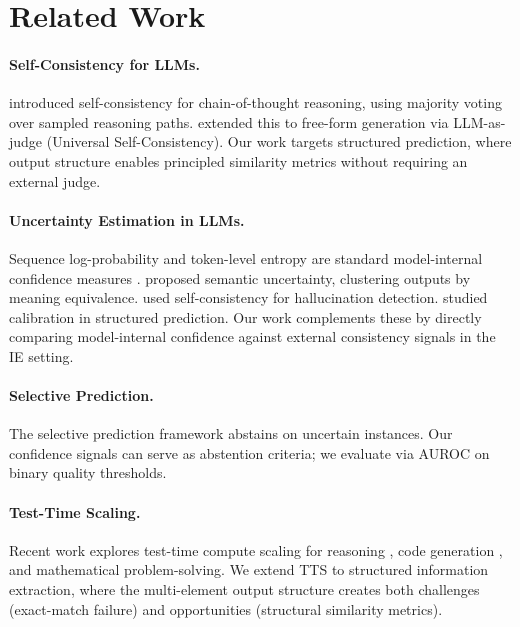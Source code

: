 \documentclass[11pt,a4paper]{article}
\begin{document}
\section{Related Work}

\paragraph{Self-Consistency for LLMs.}
\citet{wang2023selfconsistency} introduced self-consistency for chain-of-thought reasoning, using majority voting over sampled reasoning paths.
\citet{chen2024universal} extended this to free-form generation via LLM-as-judge (Universal Self-Consistency).
Our work targets structured prediction, where output structure enables principled similarity metrics without requiring an external judge.

\paragraph{Uncertainty Estimation in LLMs.}
Sequence log-probability and token-level entropy are standard model-internal confidence measures \cite{kadavath2022language}.
\citet{kuhn2023semantic} proposed semantic uncertainty, clustering outputs by meaning equivalence.
\citet{manakul2023selfcheckgpt} used self-consistency for hallucination detection.
\citet{desai2020calibration} studied calibration in structured prediction.
Our work complements these by directly comparing model-internal confidence against external consistency signals in the IE setting.

\paragraph{Selective Prediction.}
The selective prediction framework \cite{geifman2017selective,kamath2020selective} abstains on uncertain instances.
Our confidence signals can serve as abstention criteria; we evaluate via AUROC on binary quality thresholds.

\paragraph{Test-Time Scaling.}
Recent work explores test-time compute scaling for reasoning \cite{snell2024scaling}, code generation \cite{chen2023codet}, and mathematical problem-solving.
We extend TTS to structured information extraction, where the multi-element output structure creates both challenges (exact-match failure) and opportunities (structural similarity metrics).
\end{document}
